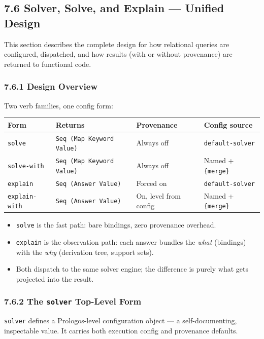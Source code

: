 \documentclass[11pt]{article}
\begin{document}
\subsection{7.6 Solver, Solve, and Explain — Unified Design}
\label{sec:orgff4c148}

This section describes the complete design for how relational queries are
configured, dispatched, and how results (with or without provenance) are
returned to functional code.
\subsubsection{7.6.1 Design Overview}
\label{sec:org243bdb7}

Two verb families, one config form:

\begin{center}
\begin{tabular}{llll}
Form & Returns & Provenance & Config source\\
\hline
\texttt{solve} & \texttt{Seq (Map Keyword Value)} & Always off & \texttt{default-solver}\\
\texttt{solve-with} & \texttt{Seq (Map Keyword Value)} & Always off & Named + \texttt{\{merge\}}\\
\texttt{explain} & \texttt{Seq (Answer Value)} & Forced on & \texttt{default-solver}\\
\texttt{explain-with} & \texttt{Seq (Answer Value)} & On, level from config & Named + \texttt{\{merge\}}\\
\end{tabular}
\end{center}

\begin{itemize}
\item \texttt{solve} is the fast path: bare bindings, zero provenance overhead.
\item \texttt{explain} is the observation path: each answer bundles the \emph{what} (bindings)
with the \emph{why} (derivation tree, support sets).
\item Both dispatch to the same solver engine; the difference is purely what
gets projected into the result.
\end{itemize}
\subsubsection{7.6.2 The \texttt{solver} Top-Level Form}
\label{sec:orgdd5f929}

\texttt{solver} defines a Prologos-level configuration object — a self-documenting,
inspectable value. It carries both execution config and provenance defaults.
\end{document}
